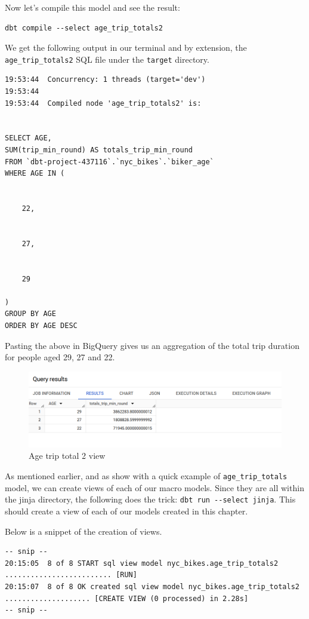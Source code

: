 \documentclass[
]{book}
\begin{document}
Now let's compile this model and see the result:

\begin{verbatim}
dbt compile --select age_trip_totals2
\end{verbatim}

We get the following output in our terminal and by extension, the \texttt{age\_trip\_totals2} SQL file under the \texttt{target} directory.

\begin{verbatim}
19:53:44  Concurrency: 1 threads (target='dev')
19:53:44  
19:53:44  Compiled node 'age_trip_totals2' is:


SELECT AGE, 
SUM(trip_min_round) AS totals_trip_min_round
FROM `dbt-project-437116`.`nyc_bikes`.`biker_age`
WHERE AGE IN (
  
  
    22, 
  
  
    27, 
  
  
    29
  
)
GROUP BY AGE
ORDER BY AGE DESC
\end{verbatim}

Pasting the above in BigQuery gives us an aggregation of the total trip duration for people aged 29, 27 and 22.

\begin{figure}
\centering
\includegraphics{./images/age_trip_totals2.png}
\caption{Age trip total 2 view}
\end{figure}

As mentioned earlier, and as show with a quick example of \texttt{age\_trip\_totals} model, we can create views of each of our macro models. Since they are all within the jinja directory, the following does the trick: \texttt{dbt\ run\ -\/-select\ jinja}. This should create a view of each of our models created in this chapter.

Below is a snippet of the creation of views.

\begin{verbatim}
-- snip --
20:15:05  8 of 8 START sql view model nyc_bikes.age_trip_totals2 ......................... [RUN]
20:15:07  8 of 8 OK created sql view model nyc_bikes.age_trip_totals2 .................... [CREATE VIEW (0 processed) in 2.28s]
-- snip --
\end{verbatim}
\end{document}
